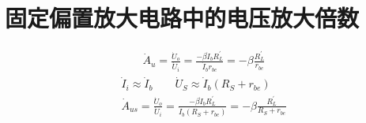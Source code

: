 \documentclass{ctexart}
\begin{document}
\section{固定偏置放大电路中的电压放大倍数}
\begin{gather*}
\dot{A}_u = \frac{\dot{U}_o}{\dot{U}_i} = \frac{-\beta\dot{I}_b R^{'}_L}{\dot{I}_b r_{be}} = -\beta\frac{R^{'}_L}{r_{be}}
\end{gather*}
\begin{gather*}
\dot{I}_i \approx \dot{I}_b \qquad \dot{U}_S \approx \dot{I}_b(R_S + r_{be}) \\
\dot{A}_{us} = \frac{\dot{U}_o}{\dot{U}_i} = \frac{-\beta\dot{I}_b R^{'}_L}{\dot{I}_b(R_S + r_{be})} = -\beta\frac{R^{'}_L}{R_S + r_{be}}
\end{gather*}
\end{document}
